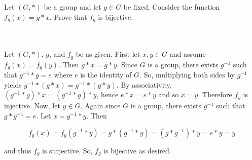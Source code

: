 Let $(G,*)$ be a group and let $g\in G$ be fixed. Consider the function $f_g(x)=g*x$. Prove that $f_g$
is bijective.\\\\

\begin{solution}\renewcommand{\qedsymbol}{}\ \\
    Let $(G,*)$, $g$, and $f_g$ be as given. First let $x,y\in G$ and assume $f_g(x)=f_g(y)$. Then
    $g*x=g*y$. Since $G$ is a group, there exists $g^{-1}$ such that $g^{-1}*g=e$ where $e$ is the
    identity of $G$. So, multiplying both sides by $g^{-1}$ yields $g^{-1}*(g*x)=g^{-1}*(g*y)$. By
    associativity, $(g^{-1}*g)*x=(g^{-1}*g)*y$, hence $e*x=e*y$ and so $x=y$. Therefore $f_g$ is
    injective. Now, let $y\in G$. Again since $G$ is a group, there exists $g^{-1}$ such that
    $g*g^{-1}=e$. Let $x=g^{-1}*y$. Then
    
    $$f_g(x)=f_g(g^{-1}*y)=g*(g^{-1}*y)=(g*g^{-1})*y=e*y=y$$
    
    and thus $f_g$ is surjective. So, $f_g$ is bijective as desired.

\end{solution}